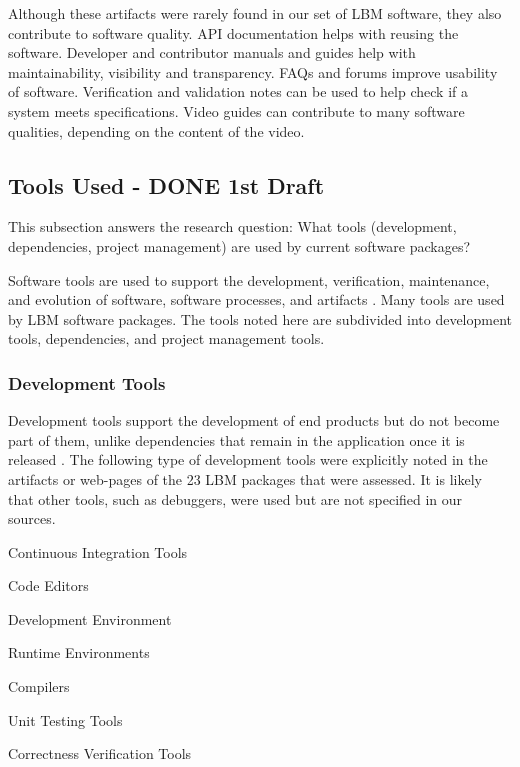 \documentclass[12pt, notitlepage]{article}
\begin{document}
Although these artifacts were rarely found in our set of LBM software, they also contribute to software quality. API documentation helps with reusing the software. Developer and contributor manuals and guides help with maintainability, visibility and transparency. FAQs and forums improve usability of software. Verification and validation notes can be used to help check if a system meets specifications. Video guides can contribute to many software qualities, depending on the content of the video. 

\subsection{Tools Used - DONE 1st Draft}\label{tools}

This subsection answers the research question: What tools (development, dependencies, project management) are used by current software packages?

Software tools are used to support the development, verification, maintenance, and evolution of software, software processes, and artifacts \citep{ghezzi1991fundamentals}. Many tools are used by LBM software packages. The tools noted here are subdivided into development tools, dependencies, and project management tools.

\subsubsection{Development Tools}

Development tools support the development of end products but do not become part of them, unlike dependencies that remain in the application once it is released \citep{ghezzi1991fundamentals}. The following type of development tools were explicitly noted in the artifacts or web-pages of the 23 LBM packages that were assessed. It is likely that other tools, such as debuggers, were used but are not specified in our sources.

	\begin{multicols}{2}	
		\begin{itemize}
		\end{itemize}
	\end{multicols}
\end{document}
